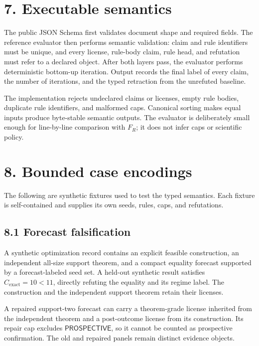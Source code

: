 \documentclass[
  11pt,
]{article}
\begin{document}
\hypertarget{executable-semantics}{%
\section{7. Executable semantics}\label{executable-semantics}}

The public JSON Schema first validates document shape and required
fields. The reference evaluator then performs semantic validation: claim
and rule identifiers must be unique, and every license, rule-body claim,
rule head, and refutation must refer to a declared object. After both
layers pass, the evaluator performs deterministic bottom-up iteration.
Output records the final label of every claim, the number of iterations,
and the typed retraction from the unrefuted baseline.

The implementation rejects undeclared claims or licenses, empty rule
bodies, duplicate rule identifiers, and malformed caps. Canonical
sorting makes equal inputs produce byte-stable semantic outputs. The
evaluator is deliberately small enough for line-by-line comparison with
\(F_R\); it does not infer caps or scientific policy.

\hypertarget{bounded-case-encodings}{%
\section{8. Bounded case encodings}\label{bounded-case-encodings}}

The following are synthetic fixtures used to test the typed semantics.
Each fixture is self-contained and supplies its own seeds, rules, caps,
and refutations.

\hypertarget{forecast-falsification}{%
\subsection{8.1 Forecast falsification}\label{forecast-falsification}}

A synthetic optimization record contains an explicit feasible
construction, an independent all-size support theorem, and a compact
equality forecast supported by a forecast-labeled seed set. A held-out
synthetic result satisfies \(C_{\mathrm{exact}}=10<11\), directly
refuting the equality and its regime label. The construction and the
independent support theorem retain their licenses.

A repaired support-two forecast can carry a theorem-grade license
inherited from the independent theorem and a post-outcome license from
its construction. Its repair cap excludes \(\textsf{PROSPECTIVE}\), so
it cannot be counted as prospective confirmation. The old and repaired
panels remain distinct evidence objects.
\end{document}
